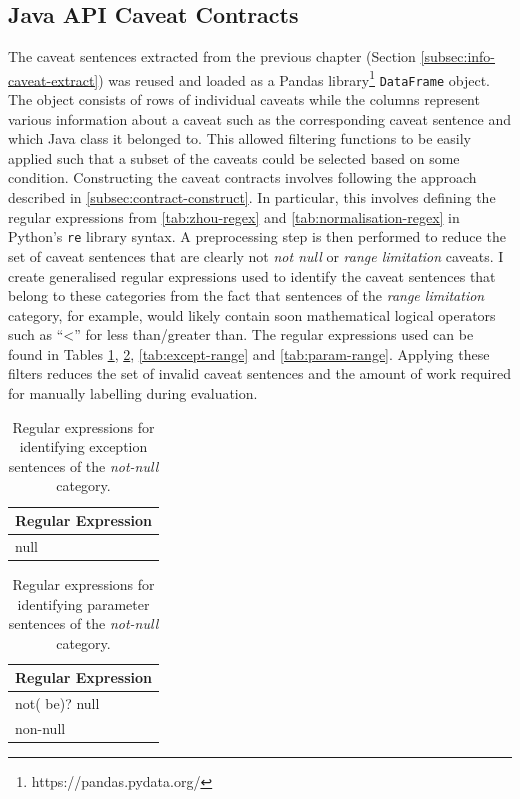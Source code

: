\subsection{Java API Caveat Contracts}
\label{subsec:contract-caveat-contracts}
The caveat sentences extracted from the previous chapter (Section \ref{subsec:info-caveat-extract}) was reused and loaded as a Pandas library\footnote{https://pandas.pydata.org/} \lstinline{DataFrame} object. The object consists of rows of individual caveats while the columns represent various information about a caveat such as the corresponding caveat sentence and which Java class it belonged to. This allowed filtering functions to be easily applied such that a subset of the caveats could be selected based on some condition. Constructing the caveat contracts involves following the approach described in \ref{subsec:contract-construct}. In particular, this involves defining the regular expressions from \ref{tab:zhou-regex} and \ref{tab:normalisation-regex} in Python's \lstinline{re} library syntax. A preprocessing step is then performed to reduce the set of caveat sentences that are clearly not \textit{not null} or \textit{range limitation} caveats. I create generalised regular expressions used to identify the caveat sentences that belong to these categories from the fact that sentences of the \textit{range limitation} category, for example, would likely contain soon mathematical logical operators such as ``<'' for less than/greater than. The regular expressions used can be found in Tables \ref{tab:except-null}, \ref{tab:param-null}, \ref{tab:except-range} and \ref{tab:param-range}. Applying these filters reduces the set of invalid caveat sentences and the amount of work required for manually labelling during evaluation.

\begin{table}[h]
	\centering
	\begin{tabular}{|l|}
		\hline
		\textbf{Regular Expression} \\ \hline
		null \\ \hline
	\end{tabular}
	\caption{Regular expressions for identifying exception sentences of the \textit{not-null} category.}
	\label{tab:except-null}
\end{table}

\begin{table}[h]
	\centering
	\begin{tabular}{|l|}
		\hline
		\textbf{Regular Expression} \\ \hline
		not( be)? null \\ \hline
		non-null \\ \hline
	\end{tabular}
	\caption{Regular expressions for identifying parameter sentences of the \textit{not-null} category.}
	\label{tab:param-null}
\end{table}

